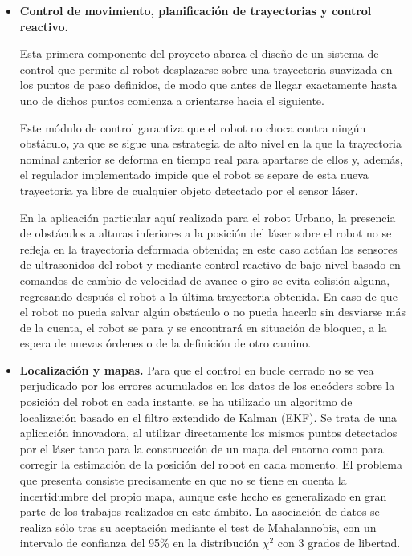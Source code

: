 \begin{itemize}
  \item \textbf{Control de movimiento, planificación de trayectorias y control reactivo.}

  Esta primera componente del proyecto abarca el diseño de un sistema de control que permite al robot desplazarse sobre una trayectoria suavizada en los puntos de paso definidos, de modo que antes de llegar exactamente hasta uno de dichos puntos comienza a orientarse hacia el siguiente. 
  
  Este módulo de control garantiza que el robot no choca contra ningún obstáculo, ya que se sigue una estrategia de alto nivel en la que la trayectoria nominal anterior se deforma en tiempo real para apartarse de ellos y, además, el regulador implementado impide que el robot se separe de esta nueva trayectoria ya libre de cualquier objeto detectado por el sensor láser. 
  
  En la aplicación particular aquí realizada para el robot Urbano, la presencia de obstáculos a alturas inferiores a la posición del láser sobre el robot no se refleja en la trayectoria deformada obtenida; en este caso actúan los sensores de ultrasonidos del robot y mediante control reactivo de bajo nivel basado en comandos de cambio de velocidad de avance o giro se evita colisión alguna, regresando después el robot a la última trayectoria obtenida. En caso de que el robot no pueda salvar algún obstáculo o no pueda hacerlo sin desviarse más de la cuenta, el robot se para y se encontrará en situación de bloqueo, a la espera de nuevas órdenes o de la definición de otro camino.

  \item \textbf{Localización y mapas.}
  Para que el control en bucle cerrado no se vea perjudicado por los errores acumulados en los datos de los encóders sobre la posición del robot en cada instante, se ha utilizado un algoritmo de localización basado en el filtro extendido de Kalman (EKF). Se trata de una aplicación innovadora, al utilizar directamente los mismos puntos detectados por el láser tanto para la construcción de un mapa del entorno como para corregir la estimación de la posición del robot en cada momento. El problema que presenta consiste precisamente en que no se tiene en cuenta la incertidumbre del propio mapa, aunque este hecho es generalizado en gran parte de los trabajos realizados en este ámbito. La asociación de datos se realiza sólo tras su aceptación mediante el test de Mahalannobis, con un intervalo de confianza del 95\% en la distribución $\chi^{2}$ con 3 grados de libertad. 
  

\end{itemize}
